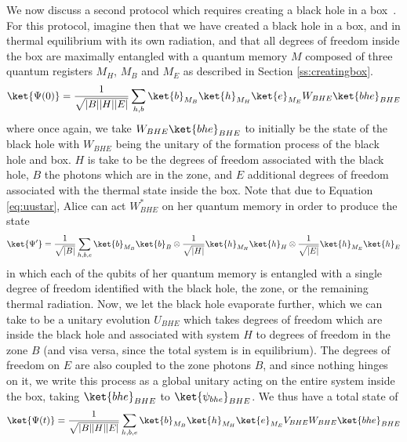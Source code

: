 \documentclass[12pt,a4paper]{article}
\begin{document}
We now discuss a second protocol which requires creating a black hole in a box~\cite{hawking1976black,hawking1983thermodynamics}.  For this protocol,
imagine then that we have 
created a black hole in a box, and in thermal equilibrium with its own radiation, and that all degrees of freedom inside the box are maximally 
entangled with a quantum memory $M$ composed of three quantum registers $M_H$, $M_B$ and $M_E$ as described in Section \ref{ss:creatingbox}.
\begin{align}
\ket{\Psi(0)}=\frac{1}{\sqrt{|B||H||E|}}
\sum_{h,b}\ket{b}_{M_B}\ket{h}_{M_H}\ket{e}_{M_E} W_{BHE} \ket{bhe}_{BHE}
\end{align}
where once again, we take $W_{BHE}\ket{bhe}_{BHE}$ to initially be the state of the black hole with $W_{BHE}$ being the unitary of the formation process of the black hole and box.  $H$ is take to be the degrees of freedom associated with the black hole, $B$ the photons which are in the zone, and $E$ additional degrees of freedom associated
with the thermal state inside the box. 
Note that due to Equation \eqref{eq:uustar}, Alice can act $W^*_{BHE}$ on her quantum memory in order to  produce the state
\begin{align}
\ket{\Psi'}=\frac{1}{\sqrt{|B|}}
\sum_{h,b,e}\ket{b}_{M_B}\ket{b}_B\otimes \frac{1}{\sqrt{|H|}}\ket{h}_{M_H} \ket{h}_{H}\otimes\frac{1}{\sqrt{|E|}}\ket{h}_{M_E} \ket{h}_{E}
\label{eq:decodeduustar}
\end{align}
in which each of the qubits of her quantum memory is entangled with a single degree of freedom identified with the black hole, the zone, or the remaining thermal radiation.
Now, we let the black hole evaporate further, which we can take to be a unitary evolution $U_{BHE}$ which takes 
degrees of freedom which are inside the black hole and associated with system $H$ to degrees of freedom in the zone $B$ (and visa versa, since the total system is in equilibrium). 
The degrees of freedom on $E$ are also coupled to the zone photons $B$, and since nothing hinges on it, we write this process as a global unitary acting on the entire system inside the box, taking  $\ket{bhe}_{BHE}$ to $\ket{\psi_{bhe}}_{BHE}$. We thus have a total state of 
\begin{align}
\ket{\Psi(t)}=\frac{1}{\sqrt{|B||H||E|}}
\sum_{h,b,e}\ket{b}_{M_B}\ket{h}_{M_H}\ket{e}_{M_E} V_{BHE}W_{BHE} \ket{bhe}_{BHE}
\label{eq:before}
\end{align}
\end{document}
